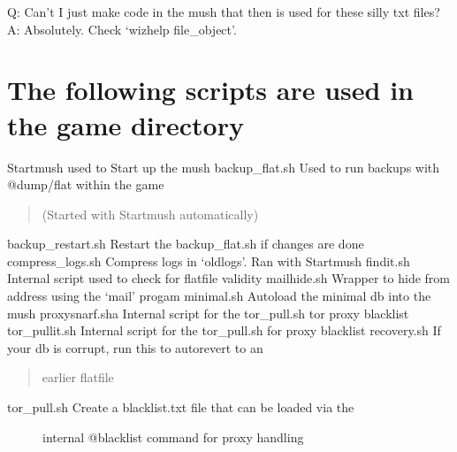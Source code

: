\documentclass[letterpaper,10pt,english]{sphinxmanual}
\begin{document}
\sphinxAtStartPar
Q:  Can’t I just make code in the mush that then is used for these silly txt files?
A:  Absolutely.  Check ‘wizhelp file\_object’.


\chapter{The following scripts are used in the game directory}
\label{\detokenize{36-scripts:the-following-scripts-are-used-in-the-game-directory}}\label{\detokenize{36-scripts::doc}}
\sphinxAtStartPar
Startmush               \textendash{} used to Start up the mush
backup\_flat.sh          \textendash{} Used to run backups with @dump/flat within the game
\begin{quote}

\sphinxAtStartPar
(Started with Startmush automatically)
\end{quote}

\sphinxAtStartPar
backup\_restart.sh       \textendash{} Restart the backup\_flat.sh if changes are done
compress\_logs.sh        \textendash{} Compress logs in ‘oldlogs’.  Ran with Startmush
findit.sh               \textendash{} Internal script used to check for flatfile validity
mailhide.sh             \textendash{} Wrapper to hide from address using the ‘mail’ progam
minimal.sh              \textendash{} Auto\sphinxhyphen{}load the minimal db into the mush
proxysnarf.sha          \textendash{} Internal script for the tor\_pull.sh tor proxy blacklist
tor\_pullit.sh           \textendash{} Internal script for the tor\_pull.sh for proxy blacklist
recovery.sh             \textendash{} If your db is corrupt, run this to auto\sphinxhyphen{}revert to an
\begin{quote}

\sphinxAtStartPar
earlier flatfile
\end{quote}
\begin{description}
\item[{tor\_pull.sh             \textendash{} Create a blacklist.txt file that can be loaded via the}] \leavevmode
\sphinxAtStartPar
internal @blacklist command for proxy handling

\end{description}
\end{document}
